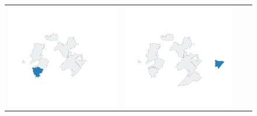 \begin{figure}
\begin{tabularx}{1\textwidth}{XXXX}
\includegraphics[width=1\linewidth]{images/ch6/loading/05}&
\includegraphics[width=1\linewidth]{images/ch6/loading/06}&

\end{tabularx}
\end{figure}
